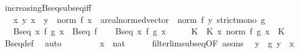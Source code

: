 \begin{isabellebody}
\endisatagproof
{\isafoldproof}%
%
\isadelimproof
\isanewline
%
\endisadelimproof
\isanewline
{}\isamarkupfalse%
\ increasing{\isacharunderscore}{\kern0pt}Bseq{\isacharunderscore}{\kern0pt}subseq{\isacharunderscore}{\kern0pt}iff{\isacharcolon}{\kern0pt}\isanewline
\ \ \ {\isachardoublequoteopen}{\isasymAnd}x\ y{\isachardot}{\kern0pt}\ x\ {\isasymle}\ y\ {\isasymLongrightarrow}\ norm\ {\isacharparenleft}{\kern0pt}f\ x\ {\isacharcolon}{\kern0pt}{\isacharcolon}{\kern0pt}\ {\isacharprime}{\kern0pt}a{\isacharcolon}{\kern0pt}{\isacharcolon}{\kern0pt}real{\isacharunderscore}{\kern0pt}normed{\isacharunderscore}{\kern0pt}vector{\isacharparenright}{\kern0pt}\ {\isasymle}\ norm\ {\isacharparenleft}{\kern0pt}f\ y{\isacharparenright}{\kern0pt}{\isachardoublequoteclose}\ {\isachardoublequoteopen}strict{\isacharunderscore}{\kern0pt}mono\ g{\isachardoublequoteclose}\isanewline
\ \ \ {\isachardoublequoteopen}Bseq\ {\isacharparenleft}{\kern0pt}{\isasymlambda}x{\isachardot}{\kern0pt}\ f\ {\isacharparenleft}{\kern0pt}g\ x{\isacharparenright}{\kern0pt}{\isacharparenright}{\kern0pt}\ {\isasymlongleftrightarrow}\ Bseq\ f{\isachardoublequoteclose}\isanewline
%
\isadelimproof
%
\endisadelimproof
%
\isatagproof
{}\isamarkupfalse%
\isanewline
\ \ \isamarkupfalse%
\ {\isachardoublequoteopen}Bseq\ {\isacharparenleft}{\kern0pt}{\isasymlambda}x{\isachardot}{\kern0pt}\ f\ {\isacharparenleft}{\kern0pt}g\ x{\isacharparenright}{\kern0pt}{\isacharparenright}{\kern0pt}{\isachardoublequoteclose}\isanewline
\ \ \isamarkupfalse%
\ \isamarkupfalse%
\ K\ \ K{\isacharcolon}{\kern0pt}\ {\isachardoublequoteopen}{\isasymAnd}x{\isachardot}{\kern0pt}\ norm\ {\isacharparenleft}{\kern0pt}f\ {\isacharparenleft}{\kern0pt}g\ x{\isacharparenright}{\kern0pt}{\isacharparenright}{\kern0pt}\ {\isasymle}\ K{\isachardoublequoteclose}\isanewline
\ \ \ \ \isamarkupfalse%
\ Bseq{\isacharunderscore}{\kern0pt}def\ \isamarkupfalse%
\ auto\isanewline
\ \ \isacommand{{\isacharbraceleft}{\kern0pt}}\isamarkupfalse%
\isanewline
\ \ \ \ \isamarkupfalse%
\ x\ {\isacharcolon}{\kern0pt}{\isacharcolon}{\kern0pt}\ nat\isanewline
\ \ \ \ \isamarkupfalse%
\ filterlim{\isacharunderscore}{\kern0pt}subseq{\isacharbrackleft}{\kern0pt}OF\ assms{\isacharparenleft}{\kern0pt}{}{\isacharparenright}{\kern0pt}{\isacharbrackright}{\kern0pt}\ \isamarkupfalse%
\ y\ \ {\isachardoublequoteopen}g\ y\ {\isasymge}\ x{\isachardoublequoteclose}\isanewline

\end{isabellebody}
